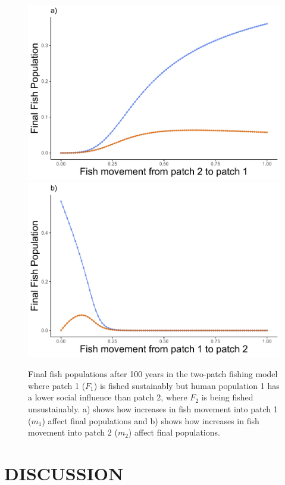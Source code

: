 \documentclass[
  12pt,
]{article}
\begin{document}
\begin{figure}
\includegraphics[width=0.5\linewidth]{Wulfing_CH2_Draft4_files/figure-latex/mExploreGraph-1} \includegraphics[width=0.5\linewidth]{Wulfing_CH2_Draft4_files/figure-latex/mExploreGraph-2} \caption{Final fish populations after 100 years in the two-patch fishing model where patch 1 (\(F_1\)) is fished sustainably but human population 1 has a lower social influence than patch 2, where \(F_2\) is being fished unsustainably. a) shows how increases in fish movement into patch 1 (\(m_1\)) affect final populations and b) shows how increases in fish movement into patch 2 (\(m_2\)) affect final populations. \label{mExploreGraph}}\label{fig:mExploreGraph}
\end{figure}



\hypertarget{discussion}{%
\section{DISCUSSION}\label{discussion}}
\end{document}
